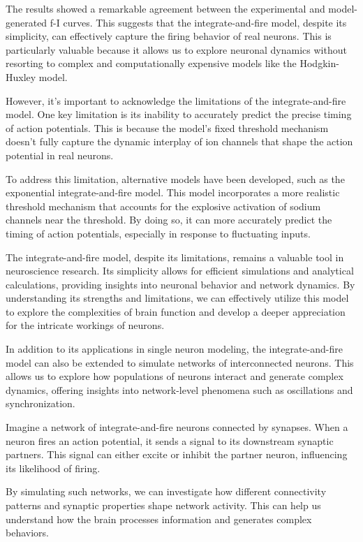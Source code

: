 The results showed a remarkable agreement between the experimental and model-generated f-I curves. This suggests that the integrate-and-fire model, despite its simplicity, can effectively capture the firing behavior of real neurons. This is particularly valuable because it allows us to explore neuronal dynamics without resorting to complex and computationally expensive models like the Hodgkin-Huxley model.

However, it's important to acknowledge the limitations of the integrate-and-fire model. One key limitation is its inability to accurately predict the precise timing of action potentials. This is because the model's fixed threshold mechanism doesn't fully capture the dynamic interplay of ion channels that shape the action potential in real neurons.

To address this limitation, alternative models have been developed, such as the exponential integrate-and-fire model. This model incorporates a more realistic threshold mechanism that accounts for the explosive activation of sodium channels near the threshold. By doing so, it can more accurately predict the timing of action potentials, especially in response to fluctuating inputs.

The integrate-and-fire model, despite its limitations, remains a valuable tool in neuroscience research. Its simplicity allows for efficient simulations and analytical calculations, providing insights into neuronal behavior and network dynamics. By understanding its strengths and limitations, we can effectively utilize this model to explore the complexities of brain function and develop a deeper appreciation for the intricate workings of neurons.

In addition to its applications in single neuron modeling, the integrate-and-fire model can also be extended to simulate networks of interconnected neurons. This allows us to explore how populations of neurons interact and generate complex dynamics, offering insights into network-level phenomena such as oscillations and synchronization.

Imagine a network of integrate-and-fire neurons connected by synapses. When a neuron fires an action potential, it sends a signal to its downstream synaptic partners. This signal can either excite or inhibit the partner neuron, influencing its likelihood of firing.

By simulating such networks, we can investigate how different connectivity patterns and synaptic properties shape network activity. This can help us understand how the brain processes information and generates complex behaviors.

